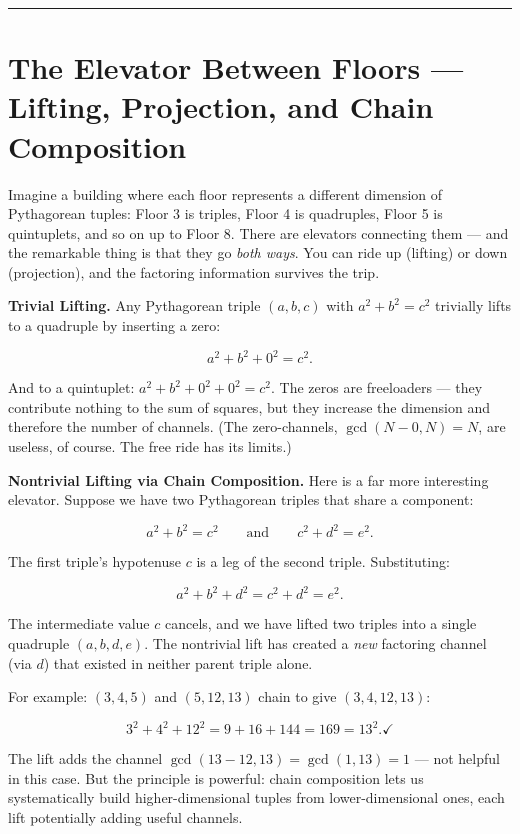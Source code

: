 \documentclass[12pt, letterpaper, openany]{book}
\theoremstyle{definition}
\theoremstyle{remark}
\begin{document}
\bigskip\noindent\rule{\textwidth}{0.4pt}\bigskip



\section*{The Elevator Between Floors --- Lifting, Projection, and Chain Composition}


Imagine a building where each floor represents a different dimension of Pythagorean tuples: Floor 3 is triples, Floor 4 is quadruples, Floor 5 is quintuplets, and so on up to Floor 8. There are elevators connecting them --- and the remarkable thing is that they go \textit{both ways}. You can ride up (lifting) or down (projection), and the factoring information survives the trip.

\textbf{Trivial Lifting.} Any Pythagorean triple $(a, b, c)$ with $a^2 + b^2 = c^2$ trivially lifts to a quadruple by inserting a zero:

\[
a^2 + b^2 + 0^2 = c^2.
\]

And to a quintuplet: $a^2 + b^2 + 0^2 + 0^2 = c^2$. The zeros are freeloaders --- they contribute nothing to the sum of squares, but they increase the dimension and therefore the number of channels. (The zero-channels, $\gcd(N - 0, N) = N$, are useless, of course. The free ride has its limits.)

\textbf{Nontrivial Lifting via Chain Composition.} Here is a far more interesting elevator. Suppose we have two Pythagorean triples that share a component:

\[
a^2 + b^2 = c^2 \qquad \text{and} \qquad c^2 + d^2 = e^2.
\]

The first triple's hypotenuse $c$ is a leg of the second triple. Substituting:

\[
a^2 + b^2 + d^2 = c^2 + d^2 = e^2.
\]

The intermediate value $c$ cancels, and we have lifted two triples into a single quadruple $(a, b, d, e)$. The nontrivial lift has created a \textit{new} factoring channel (via $d$) that existed in neither parent triple alone.

For example: $(3, 4, 5)$ and $(5, 12, 13)$ chain to give $(3, 4, 12, 13)$:

\[
3^2 + 4^2 + 12^2 = 9 + 16 + 144 = 169 = 13^2. \checkmark
\]

The lift adds the channel $\gcd(13 - 12, 13) = \gcd(1, 13) = 1$ --- not helpful in this case. But the principle is powerful: chain composition lets us systematically build higher-dimensional tuples from lower-dimensional ones, each lift potentially adding useful channels.
\end{document}
